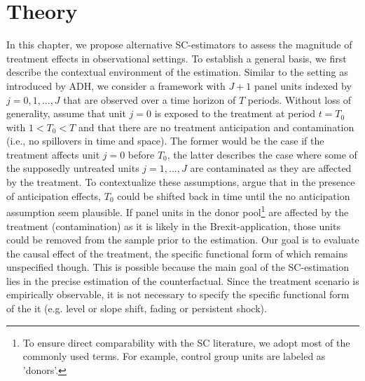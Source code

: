 \section{Theory}
\begin{comment}
\textcolor{magenta}{\textbf{What must be clear by now
	 \begin{itemize}
	 	\item Consider case without covariates
	 	\item Make clear that SC is a weighted average of the donors
	 \end{itemize}}}
\end{comment}
In this chapter, we propose alternative \ac{SC}-estimators to assess the magnitude of treatment effects in observational settings. To establish a general basis, we first describe the contextual environment of the estimation. Similar to the setting as introduced by \ac{ADH}, we consider a framework with $J+1$ panel units indexed by $j = 0,1, ..., J$ that are observed over a time horizon of $T$ periods. Without loss of generality, assume that unit $j = 0$ is exposed to the treatment at period $t = T_0$ with $1 < T_0 < T$ and that there are no treatment anticipation and contamination (i.e., no spillovers in time and space). The former would be the case if the treatment affects unit $j = 0$ before $T_0$, the latter describes the case where some of the supposedly untreated units $j = 1,...,J$ are contaminated as they are affected by the treatment. To contextualize these assumptions, \cite{abadie:2010} argue that in the presence of anticipation effects, $T_0$ could be shifted back in time until the no anticipation assumption seem plausible. If panel units in the donor pool\footnote{To ensure direct comparability with the \ac{SC} literature, we adopt most of the commonly used terms. For example, control group units are labeled as 'donors'.} are affected by the treatment (contamination) as it is likely in the Brexit-application, those units could be removed from the sample prior to the estimation. Our goal is to evaluate the causal effect of the treatment, the specific functional form of which remains unspecified though. This is possible because the main goal of the \ac{SC}-estimation lies in the precise estimation of the counterfactual. Since the treatment  scenario is empirically observable, it is not necessary to specify the specific functional form of the it (e.g. level or slope shift, fading or persistent shock).

